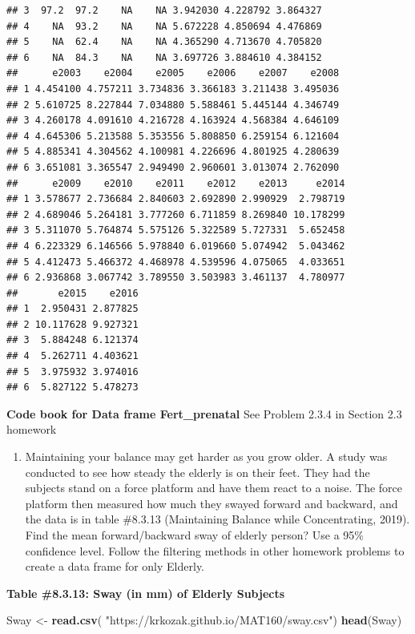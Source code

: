 \documentclass[
]{book}
\newenvironment{Shaded}{\begin{snugshade}}{\end{snugshade}}
\newcommand{\KeywordTok}[1]{\textcolor[rgb]{0.13,0.29,0.53}{\textbf{#1}}}
\newcommand{\NormalTok}[1]{#1}
\newcommand{\StringTok}[1]{\textcolor[rgb]{0.31,0.60,0.02}{#1}}
\providecommand{\tightlist}{%
  \setlength{\itemsep}{0pt}\setlength{\parskip}{0pt}}
\begin{document}
\begin{verbatim}
## 3  97.2  97.2    NA    NA 3.942030 4.228792 3.864327
## 4    NA  93.2    NA    NA 5.672228 4.850694 4.476869
## 5    NA  62.4    NA    NA 4.365290 4.713670 4.705820
## 6    NA  84.3    NA    NA 3.697726 3.884610 4.384152
##      e2003    e2004    e2005    e2006    e2007    e2008
## 1 4.454100 4.757211 3.734836 3.366183 3.211438 3.495036
## 2 5.610725 8.227844 7.034880 5.588461 5.445144 4.346749
## 3 4.260178 4.091610 4.216728 4.163924 4.568384 4.646109
## 4 4.645306 5.213588 5.353556 5.808850 6.259154 6.121604
## 5 4.885341 4.304562 4.100981 4.226696 4.801925 4.280639
## 6 3.651081 3.365547 2.949490 2.960601 3.013074 2.762090
##      e2009    e2010    e2011    e2012    e2013     e2014
## 1 3.578677 2.736684 2.840603 2.692890 2.990929  2.798719
## 2 4.689046 5.264181 3.777260 6.711859 8.269840 10.178299
## 3 5.311070 5.764874 5.575126 5.322589 5.727331  5.652458
## 4 6.223329 6.146566 5.978840 6.019660 5.074942  5.043462
## 5 4.412473 5.466372 4.468978 4.539596 4.075065  4.033651
## 6 2.936868 3.067742 3.789550 3.503983 3.461137  4.780977
##       e2015    e2016
## 1  2.950431 2.877825
## 2 10.117628 9.927321
## 3  5.884248 6.121374
## 4  5.262711 4.403621
## 5  3.975932 3.974016
## 6  5.827122 5.478273
\end{verbatim}

\textbf{Code book for Data frame Fert\_prenatal} See Problem 2.3.4 in Section 2.3 homework

\begin{enumerate}
\def\labelenumi{\arabic{enumi}.}
\setcounter{enumi}{6}
\tightlist
\item
  Maintaining your balance may get harder as you grow older. A study was conducted to see how steady the elderly is on their feet. They had the subjects stand on a force platform and have them react to a noise. The force platform then measured how much they swayed forward and backward, and the data is in table \#8.3.13 (Maintaining Balance while Concentrating, 2019). Find the mean forward/backward sway of elderly person? Use a 95\% confidence level. Follow the filtering methods in other homework problems to create a data frame for only Elderly.
\end{enumerate}

\textbf{Table \#8.3.13: Sway (in mm) of Elderly Subjects}

\begin{Shaded}
\begin{Highlighting}[]
\NormalTok{Sway <-}\StringTok{ }\KeywordTok{read.csv}\NormalTok{(}
  \StringTok{"https://krkozak.github.io/MAT160/sway.csv"}\NormalTok{)}
\KeywordTok{head}\NormalTok{(Sway)}
\end{Highlighting}
\end{Shaded}
\end{document}

